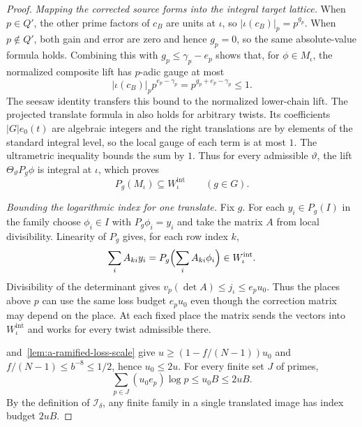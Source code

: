 \begin{proof}
\emph{Mapping the corrected source forms into the integral target lattice.}
When $p\in Q'$, the other prime factors of $c_B$ are units at $\iota$, so $|\iota(c_B)|_p=p^{g_p}$. When $p\notin Q'$, both gain and error are zero and hence $g_p=0$, so the same absolute-value formula holds. Combining this with $g_p\le\gamma_p-e_p$ shows that, for $\phi\in M_\iota$, the normalized composite lift has $p$-adic gauge at most
\[
 |\iota(c_B)|_p p^{e_p-\gamma_p}=p^{g_p+e_p-\gamma_p}\le1 .
\]
The seesaw identity transfers this bound to the normalized lower-chain lift. The projected translate formula in  also holds for arbitrary twists. Its coefficients $|G|e_0(t)$ are algebraic integers and the right translations are by elements of the standard integral level, so the local gauge of each term is at most $1$. The ultrametric inequality bounds the sum by $1$. Thus for every admissible $\vartheta$, the lift $\Theta_\vartheta P_g\phi$ is integral at $\iota$, which proves
\[
 P_g(M_\iota)\subseteq W_\iota^{\mathrm{int}}
 \qquad (g\in G).
\]

\emph{Bounding the logarithmic index for one translate.}
Fix $g$. For each $y_i\in P_g(I)$ in the family choose $\phi_i\in I$ with $P_g\phi_i=y_i$ and take the matrix $A$ from local divisibility. Linearity of $P_g$ gives, for each row index $k$,
\[
 \sum_i A_{ki}y_i=P_g\Bigl(\sum_i A_{ki}\phi_i\Bigr)\in W_\iota^{\mathrm{int}}.
\]
Divisibility of the determinant gives $v_p(\det A)\le j_\iota\le e_pu_0$. Thus the places above $p$ can use the same loss budget $e_pu_0$ even though the correction matrix may depend on the place. At each fixed place the matrix sends the vectors into $W_\iota^{\mathrm{int}}$ and works for every twist admissible there.

 and~\ref{lem:a-ramified-loss-scale} give $u\ge(1-f/(N-1))u_0$ and $f/(N-1)\le b^{-8}\le1/2$, hence $u_0\le2u$. For every finite set $J$ of primes,
\[
 \sum_{p\in J}(u_0e_p)\log p
 \le u_0B\le2uB.
\]
By the definition of $\mathcal I_\delta$, any finite family in a single translated image has index budget $2uB$.


\end{proof}
